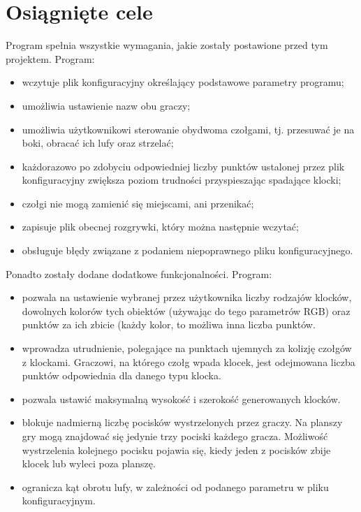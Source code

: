 \documentclass[12pt]{report}
\begin{document}
\section{Osiągnięte cele}
Program spełnia wszystkie wymagania, jakie zostały postawione przed tym projektem. Program:
\begin{itemize}
    \item wczytuje plik konfiguracyjny określający podstawowe parametry programu;
    \item umożliwia ustawienie nazw obu graczy;
    \item umożliwia użytkownikowi sterowanie obydwoma czołgami, tj. przesuwać je na boki, obracać ich lufy oraz strzelać;
    \item każdorazowo po zdobyciu odpowiedniej liczby punktów ustalonej przez plik konfiguracyjny zwiększa poziom trudności przyspieszając spadające klocki;
    \item czołgi nie mogą zamienić się miejscami, ani przenikać;
    \item zapisuje plik obecnej rozgrywki, który można następnie wczytać;
    \item obsługuje błędy związane z podaniem niepoprawnego pliku konfiguracyjnego.
\end{itemize}
Ponadto zostały dodane dodatkowe funkcjonalności. Program:
\begin{itemize}
    \item pozwala na ustawienie wybranej przez użytkownika liczby rodzajów klocków, dowolnych kolorów tych obiektów (używając do tego parametrów RGB) oraz punktów za ich zbicie (każdy kolor, to możliwa inna liczba punktów.
    \item wprowadza utrudnienie, polegające na punktach ujemnych za kolizję czołgów z klockami. Graczowi, na którego czołg wpada klocek, jest odejmowana liczba punktów odpowiednia dla danego typu klocka.
    \item pozwala ustawić maksymalną wysokość i szerokość generowanych klocków.
    \item blokuje nadmierną liczbę pocisków wystrzelonych przez graczy. Na planszy gry mogą znajdować się jedynie trzy pociski każdego gracza. Możliwość wystrzelenia kolejnego pocisku pojawia się, kiedy jeden z pocisków zbije klocek lub wyleci poza planszę.
    \item ogranicza kąt obrotu lufy, w zależności od podanego parametru w pliku konfiguracyjnym.
    
\end{itemize}
\end{document}
